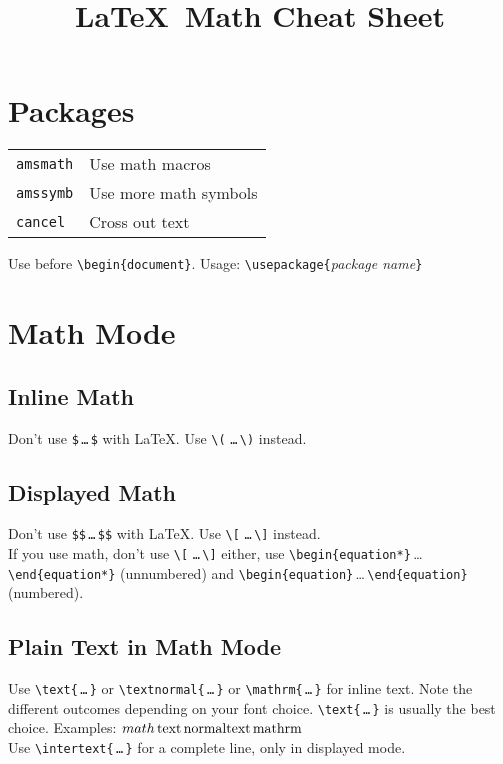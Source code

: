 \documentclass[draft]{../cheatsht/cheatsht}
\begin{document}
\title{\LaTeX~Math Cheat Sheet}

\section{Packages}

\begin{tabular}{@{}ll@{}}
\texttt{amsmath} & Use math macros \\
\texttt{amssymb} & Use more math symbols \\
\texttt{cancel} & Cross out text
\end{tabular}

Use before \verb!\begin{document}!.
Usage: \verb!\usepackage{!\textit{package name}\verb!}!

\section{Math Mode}
\subsection{Inline Math}
Don't use \verb!$!\,\verb!…!\,\verb!$! with \LaTeX.
Use \verb!\(! \verb!…!\,\verb!\)! instead.

\subsection{Displayed Math}
Don't use \verb!$$!\,\verb!…!\,\verb!$$! with \LaTeX. Use
\verb!\[! \verb!…!\,\verb!\]! instead. \\

If you use \AmS\hspace{1pt}math, don't use \verb!\[! \verb!…!\,\verb!\]! either,
use
\verb!\begin{equation*}!\,\ldots\,\verb!\end{equation*}!
(unnumbered) and \verb!\begin{equation}!\,\ldots\,\verb!\end{equation}!
(numbered).

\subsection{Plain Text in Math Mode}
Use \verb!\text{!\,\verb!…!\,\verb!}! or \verb!\textnormal{!\,\verb!…!\,\verb!}!
or \verb!\mathrm{!\,\verb!…!\,\verb!}! for inline text.
Note the different outcomes depending on your font choice.
\verb!\text{!\,\verb!…!\,\verb!}! is usually the best choice. Examples:
\( math\,\text{text}\,\textnormal{normaltext}\,\mathrm{mathrm}\)\\
Use \verb!\intertext{!\,\verb!…!\,\verb!}! for a complete line, only in
displayed mode.
\end{document}
